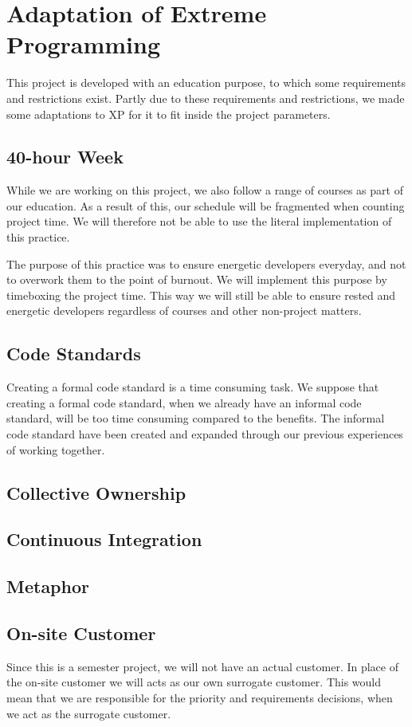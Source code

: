 \section{Adaptation of Extreme Programming}
This project is developed with an education purpose, to which some requirements and restrictions exist.
Partly due to these requirements and restrictions, we made some adaptations to XP for it to fit inside the project parameters.

\subsection{40-hour Week}
While we are working on this project, we also follow a range of courses as part of our education.
As a result of this, our schedule will be fragmented when counting project time.
We will therefore not be able to use the literal implementation of this practice.

The purpose of this practice was to ensure energetic developers everyday, and not to overwork them to the point of burnout.
We will implement this purpose by timeboxing the project time.
This way we will still be able to ensure rested and energetic developers regardless of courses and other non-project matters.

\subsection{Code Standards}
Creating a formal code standard is a time consuming task.
We suppose that creating a formal code standard, when we already have an informal code standard, will be too time consuming compared to the benefits.
The informal code standard have been created and expanded through our previous experiences of working together.


\subsection{Collective Ownership}


\subsection{Continuous Integration}


\subsection{Metaphor}


\subsection{On-site Customer}
Since this is a semester project, we will not have an actual customer.
In place of the on-site customer we will acts as our own surrogate customer.
This would mean that we are responsible for the priority and requirements decisions, when we act as the surrogate customer.

